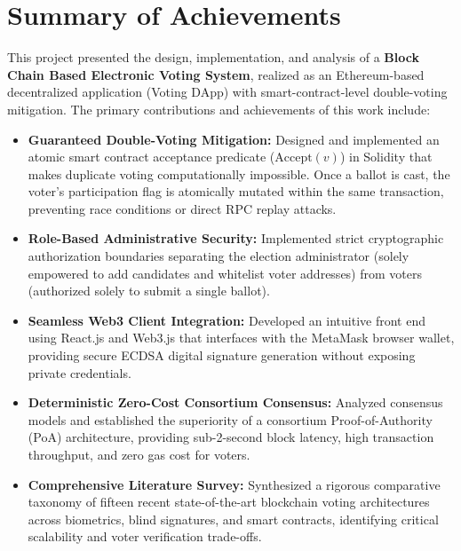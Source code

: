 \documentclass[12pt,a4paper]{report}
\begin{document}
\section{Summary of Achievements}
This project presented the design, implementation, and analysis of a \textbf{Block Chain Based Electronic Voting System}, realized as an Ethereum-based decentralized application (Voting DApp) with smart-contract-level double-voting mitigation. The primary contributions and achievements of this work include:
\begin{itemize}
    \item \textbf{Guaranteed Double-Voting Mitigation:} Designed and implemented an atomic smart contract acceptance predicate ($\text{Accept}(v)$) in Solidity that makes duplicate voting computationally impossible. Once a ballot is cast, the voter's participation flag is atomically mutated within the same transaction, preventing race conditions or direct RPC replay attacks.
    \item \textbf{Role-Based Administrative Security:} Implemented strict cryptographic authorization boundaries separating the election administrator (solely empowered to add candidates and whitelist voter addresses) from voters (authorized solely to submit a single ballot).
    \item \textbf{Seamless Web3 Client Integration:} Developed an intuitive front end using React.js and Web3.js that interfaces with the MetaMask browser wallet, providing secure ECDSA digital signature generation without exposing private credentials.
    \item \textbf{Deterministic Zero-Cost Consortium Consensus:} Analyzed consensus models and established the superiority of a consortium Proof-of-Authority (PoA) architecture, providing sub-2-second block latency, high transaction throughput, and zero gas cost for voters.
    \item \textbf{Comprehensive Literature Survey:} Synthesized a rigorous comparative taxonomy of fifteen recent state-of-the-art blockchain voting architectures across biometrics, blind signatures, and smart contracts, identifying critical scalability and voter verification trade-offs.
\end{itemize}
\end{document}
